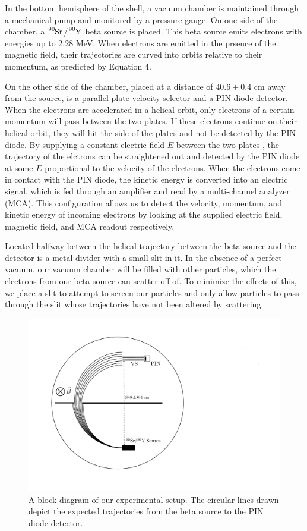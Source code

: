 In the bottom hemisphere of the shell, a vacuum chamber is maintained through a mechanical pump and monitored by a pressure gauge. On one side of the chamber, a $\tensor*[^{90}]{\text{Sr}}{}$/$\tensor*[^{90}]{\text{Y}}{}$ beta source is placed. This beta source emits electrons with energies up to $2.28$ MeV. When electrons are emitted in the prsence of the magnetic field, their trajectories are curved into orbits relative to their momentum, as predicted by Equation 4.

On the other side of the chamber, placed at a distance of $40.6 \pm 0.4$ cm away from the source, is a parallel-plate velocity selector and a PIN diode detector. When the electrons are accelerated in a helical orbit, only electrons of a certain momentum will pass between the two plates. If these electrons continue on their helical orbit, they will hit the side of the plates and not be detected by the PIN diode. By supplying a constant electric field $E$ between the two plates , the trajectory of the elctrons can be straightened out and detected by the PIN diode at some $E$ proportional to the velocity of the electrons. When the electrons come in contact with the PIN diode, the kinetic energy is converted into an electric signal, which is fed through an amplifier and read by a multi-channel analyzer (MCA). This configuration allows us to detect the velocity, momentum, and kinetic energy of incoming electrons by looking at the supplied electric field, magnetic field, and MCA readout respectively.

Located halfway between the helical trajectory between the beta source and the detector is a metal divider with a small slit in it. In the absence of a perfect vacuum, our vacuum chamber will be filled with other particles, which the electrons from our beta source can scatter off of. To minimize the effects of this, we place a slit to attempt to screen our particles and only allow particles to pass through the slit whose trajectories have not been altered by scattering.

\begin{figure}[h]
  \includegraphics[width=.5\textwidth]{setup2.png}
  \caption{A block diagram of our experimental setup. The circular lines drawn depict the expected trajectories from the beta source to the PIN diode detector.}
\end{figure}

